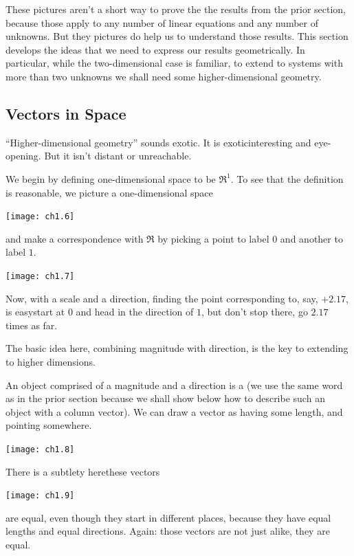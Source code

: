 These pictures aren't a short way to prove the 
the results from the prior section, because those apply
to any number of linear equations and any number of unknowns. 
But they pictures do help us to understand those results.
This section develops the ideas that we need to
express our results geometrically. 
In particular, while
the two-dimensional case is familiar, to extend to systems with
more than two unknowns we shall need some higher-dimensional geometry.














\subsection{Vectors in Space}
``Higher-dimensional geometry'' sounds exotic.
It is exotic\Dash interesting and eye-opening.
But it isn't distant or unreachable.

We begin by defining one-dimensional space to be \( \Re^1 \).
To see that the definition is reasonable, 
we picture a one-dimensional space
\begin{center}
  \texttt{[image: ch1.6]}
\end{center}
and make a correspondence with \( \Re \) by
picking a point to label $0$ and another to label $1$.
\begin{center}
  \texttt{[image: ch1.7]}
\end{center}
Now, with a scale and a direction,
finding the point corresponding to, say,
\( +2.17 \), is easy\Dash start at \( 0 \) and head in the direction of \( 1 \),
but don't stop there, go \( 2.17 \) times as far.

The basic idea here, combining magnitude with direction, is the
key to extending to higher dimensions.

An object comprised of a magnitude and a direction is a
(we use the same word as in the prior section because we shall show
below how to describe such
an object with a column vector).
We can draw a vector as having some length, and pointing somewhere.
\begin{center}
  \texttt{[image: ch1.8]}
\end{center}
There is a subtlety here\Dash these vectors
\begin{center}
  \texttt{[image: ch1.9]}
\end{center}
are equal, even though they start in different places,
because they have equal lengths and equal directions.
Again: those vectors are not just alike, they are equal.

